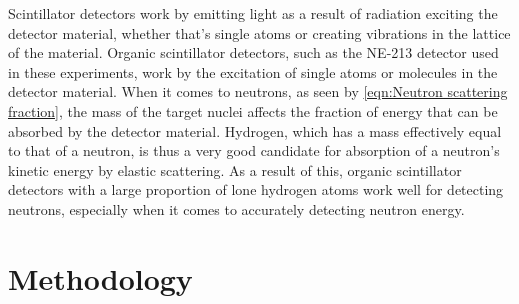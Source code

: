 \documentclass[11pt]{article}
\numberwithin{equation}{section}
\numberwithin{figure}{section}
\numberwithin{table}{section}
\begin{document}
\par Scintillator detectors work by emitting light as a result of radiation exciting the detector material, whether that's single atoms or creating vibrations in the lattice of the material. Organic scintillator detectors, such as the NE-213 detector used in these experiments, work by the excitation of single atoms or molecules in the detector material. When it comes to neutrons, as seen by \cref{eqn:Neutron scattering fraction}, the mass of the target nuclei affects the fraction of energy that can be absorbed by the detector material. Hydrogen, which has a mass effectively equal to that of a neutron, is thus a very good candidate for absorption of a neutron's kinetic energy by elastic scattering. As a result of this, organic scintillator detectors with a large proportion of lone hydrogen atoms work well for detecting neutrons, especially when it comes to accurately detecting neutron energy.
\par 







\par 

\section{Methodology}\label{sec:Methodology}




\begin{thebibliography}{9}

    
\end{thebibliography}
\end{document}
